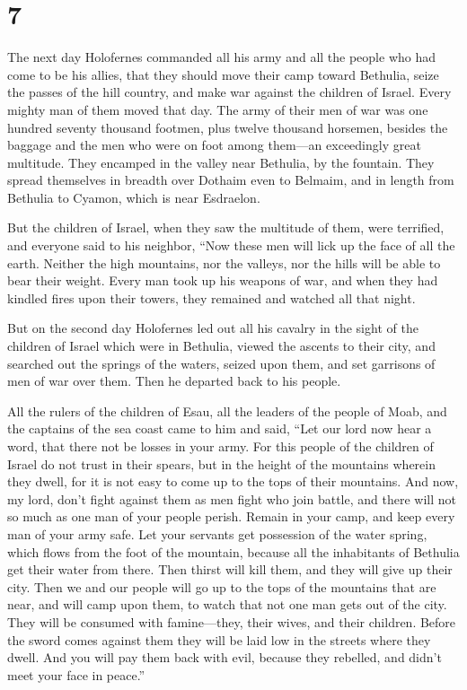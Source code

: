 \hypertarget{section-6}{%
\section{7}\label{section-6}}

 The next day Holofernes commanded all his army and all
the people who had come to be his allies, that they should move their
camp toward Bethulia, seize the passes of the hill country, and make war
against the children of Israel.  Every mighty man of them
moved that day. The army of their men of war was one hundred seventy
thousand footmen, plus twelve thousand horsemen, besides the baggage and
the men who were on foot among them---an exceedingly great multitude.
 They encamped in the valley near Bethulia, by the
fountain. They spread themselves in breadth over Dothaim even to
Belmaim, and in length from Bethulia to Cyamon, which is near Esdraelon.

 But the children of Israel, when they saw the multitude
of them, were terrified, and everyone said to his neighbor, ``Now these
men will lick up the face of all the earth. Neither the high mountains,
nor the valleys, nor the hills will be able to bear their weight.
 Every man took up his weapons of war, and when they had
kindled fires upon their towers, they remained and watched all that
night.

 But on the second day Holofernes led out all his cavalry
in the sight of the children of Israel which were in Bethulia,
 viewed the ascents to their city, and searched out the
springs of the waters, seized upon them, and set garrisons of men of war
over them. Then he departed back to his people.

 All the rulers of the children of Esau, all the leaders
of the people of Moab, and the captains of the sea coast came to him and
said,  ``Let our lord now hear a word, that there not be
losses in your army.  For this people of the children of
Israel do not trust in their spears, but in the height of the mountains
wherein they dwell, for it is not easy to come up to the tops of their
mountains.  And now, my lord, don't fight against them as
men fight who join battle, and there will not so much as one man of your
people perish.  Remain in your camp, and keep every man
of your army safe. Let your servants get possession of the water spring,
which flows from the foot of the mountain,  because all
the inhabitants of Bethulia get their water from there. Then thirst will
kill them, and they will give up their city. Then we and our people will
go up to the tops of the mountains that are near, and will camp upon
them, to watch that not one man gets out of the city. 
They will be consumed with famine---they, their wives, and their
children. Before the sword comes against them they will be laid low in
the streets where they dwell.  And you will pay them back
with evil, because they rebelled, and didn't meet your face in peace.''

